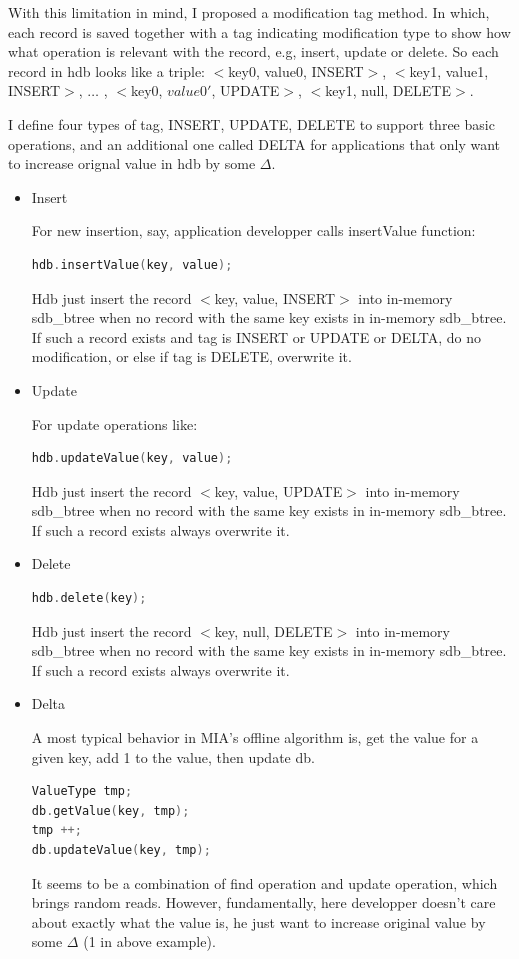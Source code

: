 \documentclass[a4paper,10pt]{article}
\begin{document}
With this limitation in mind, I proposed a modification tag method. In which, each record is saved together with a tag indicating modification type to show how what operation is relevant with the record, e.g, insert, update or delete.
So each record in hdb looks like a triple: $<$key0, value0, INSERT$>$, $<$key1, value1, INSERT$>$, $\dots$ , $<$key0, $value0'$, UPDATE$>$, $<$key1, null, DELETE$>$.

I define four types of tag, INSERT, UPDATE, DELETE to support three basic operations, and an additional one called DELTA for applications that only want to increase orignal value in hdb by some $\Delta$.

\begin{itemize}
\item Insert

For new insertion, say, application developper calls insertValue function:
\begin{lstlisting}[language=C]
hdb.insertValue(key, value); 
\end{lstlisting}
Hdb just insert the record $<$key, value, INSERT$>$ into in-memory sdb\_btree when no record with the same key exists in in-memory sdb\_btree. If such a record exists and tag is INSERT or UPDATE or DELTA, do no modification,
or else if tag is DELETE, overwrite it.

\item Update

For update operations like:
\begin{lstlisting}[language=C]
hdb.updateValue(key, value); 
\end{lstlisting}
Hdb just insert the record $<$key, value, UPDATE$>$ into in-memory sdb\_btree when no record with the same key exists in in-memory sdb\_btree. If such a record exists always overwrite it.

\item Delete

\begin{lstlisting}[language=C]
hdb.delete(key); 
\end{lstlisting}
Hdb just insert the record $<$key, null, DELETE$>$ into in-memory sdb\_btree when no record with the same key exists in in-memory sdb\_btree. If such a record exists always overwrite it.

\item Delta

A most typical behavior in MIA's offline algorithm is, get the value for a given key, add 1 to the value, then update db.
\begin{lstlisting}[language=C]
ValueType tmp;
db.getValue(key, tmp);
tmp ++;
db.updateValue(key, tmp);
\end{lstlisting}
It seems to be a combination of find operation and update operation, which brings random reads. However, fundamentally, here developper doesn't care about exactly what the value is,
he just want to increase original value by some $\Delta$ (1 in above example).


\end{itemize}
\end{document}
